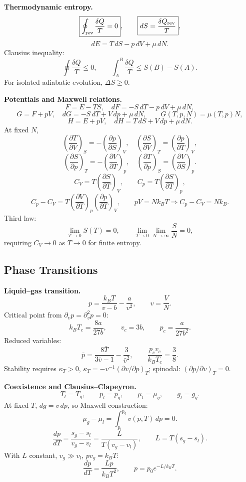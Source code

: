 \noindent\textbf{Thermodynamic entropy.}\quad
\[
\boxed{\oint_{\rm rev}\frac{\delta Q}{T}=0},
\qquad
\boxed{dS=\frac{\delta Q_{\rm rev}}{T}},
\]
\[
\boxed{dE=T\,dS-p\,dV+\mu\,dN}.
\]
Clausius inequality:
\[
\boxed{\oint\frac{\delta Q}{T}\le0},
\qquad
\int_A^B\frac{\delta Q}{T}\le S(B)-S(A).
\]
For isolated adiabatic evolution, $\boxed{\Delta S\ge0}$.

\noindent\textbf{Potentials and Maxwell relations.}\quad
\[
F=E-TS,\quad dF=-S\,dT-p\,dV+\mu\,dN,
\]
\[
G=F+pV,\quad dG=-S\,dT+V\,dp+\mu\,dN,
\qquad
\boxed{G(T,p,N)=\mu(T,p)N},
\]
\[
H=E+pV,\quad dH=T\,dS+V\,dp+\mu\,dN.
\]
At fixed $N$,
\[
\boxed{\left(\frac{\partial T}{\partial V}\right)_S
=-\left(\frac{\partial p}{\partial S}\right)_V},
\quad
\boxed{\left(\frac{\partial S}{\partial V}\right)_T
=\left(\frac{\partial p}{\partial T}\right)_V},
\]
\[
\boxed{\left(\frac{\partial S}{\partial p}\right)_T
=-\left(\frac{\partial V}{\partial T}\right)_p},
\quad
\boxed{\left(\frac{\partial T}{\partial p}\right)_S
=\left(\frac{\partial V}{\partial S}\right)_p}.
\]
\[
C_V=T\left(\frac{\partial S}{\partial T}\right)_V,\qquad
C_p=T\left(\frac{\partial S}{\partial T}\right)_p,
\]
\[
\boxed{C_p-C_V=
T\left(\frac{\partial V}{\partial T}\right)_p
\left(\frac{\partial p}{\partial T}\right)_V},
\qquad
pV=Nk_BT\Rightarrow C_p-C_V=Nk_B.
\]
Third law:
\[
\boxed{\lim_{T\to0}S(T)=0},
\qquad
\lim_{T\to0}\lim_{N\to\infty}\frac{S}{N}=0,
\]
requiring $C_V\to0$ as $T\to0$ for finite entropy.

\subsection{Phase Transitions}

\noindent\textbf{Liquid--gas transition.}\quad
\[
p=\frac{k_BT}{v-b}-\frac{a}{v^2},\qquad v=\frac{V}{N}.
\]
Critical point from $\partial_vp=\partial_v^2p=0$:
\[
\boxed{k_BT_c=\frac{8a}{27b}},\qquad
\boxed{v_c=3b},\qquad
\boxed{p_c=\frac{a}{27b^2}}.
\]
Reduced variables:
\[
\boxed{\bar p=\frac{8\bar T}{3\bar v-1}-\frac{3}{\bar v^2}},
\qquad
\boxed{\frac{p_cv_c}{k_BT_c}=\frac38}.
\]
Stability requires $\kappa_T>0$,
$\kappa_T=-v^{-1}(\partial v/\partial p)_T$; spinodal:
$(\partial p/\partial v)_T=0$.

\noindent\textbf{Coexistence and Clausius--Clapeyron.}\quad
\[
T_l=T_g,\qquad p_l=p_g,\qquad \mu_l=\mu_g,\qquad g_l=g_g.
\]
At fixed $T$, $dg=v\,dp$, so Maxwell construction:
\[
\boxed{\mu_g-\mu_l=\int_{p_l}^{p_g}v(p,T)\,dp=0}.
\]
\[
\boxed{\frac{dp}{dT}=\frac{s_g-s_l}{v_g-v_l}
=\frac{L}{T(v_g-v_l)}},
\qquad L=T(s_g-s_l).
\]
With $L$ constant, $v_g\gg v_l$, $pv_g=k_BT$:
\[
\frac{dp}{dT}=\frac{Lp}{k_BT^2},
\qquad p=p_0e^{-L/k_BT}.
\]


